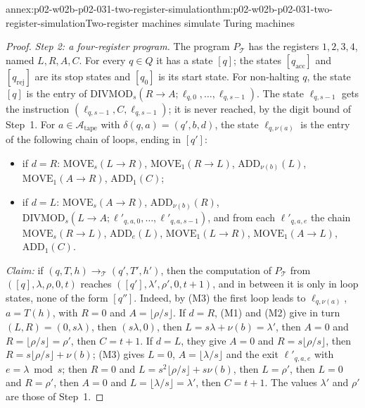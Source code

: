 \begin{annexitem}{annex:p02-w02b-p02-031-two-register-simulation}{thm:p02-w02b-p02-031-two-register-simulation}{Two-register machines simulate Turing machines}
\begin{proof}
\emph{Step 2: a four-register program.}  The program \(P_{\mathcal T}\) has the
registers \(1,2,3,4\), named \(L,R,A,C\).  For every \(q\in Q\) it has a state
\([q]\); the states \([q_{\mathrm{acc}}]\) and \([q_{\mathrm{rej}}]\) are its stop
states and \([q_0]\) is its start state.  For non-halting \(q\), the state
\([q]\) is the entry of \(\mathrm{DIVMOD}_s(R\to A;\allowbreak\ell_{q,0},\ldots,
\ell_{q,s-1})\).  The state \(\ell_{q,s-1}\) gets the instruction
\((\ell_{q,s-1},C,\ell_{q,s-1})\); it is never reached, by the digit bound of
Step~1.  For \(a\in\mathcal A_{\mathrm{tape}}\) with
\(\delta(q,a)=(q',b,d)\), the state \(\ell_{q,\nu(a)}\) is the entry of the
following chain of loops, ending in \([q']\):
\begin{itemize}
\item if \(d=R\): \(\mathrm{MOVE}_s(L\to R)\), \(\mathrm{MOVE}_1(R\to L)\),
      \(\mathrm{ADD}_{\nu(b)}(L)\), \(\mathrm{MOVE}_1(A\to R)\),
      \(\mathrm{ADD}_1(C)\);
\item if \(d=L\): \(\mathrm{MOVE}_s(A\to R)\), \(\mathrm{ADD}_{\nu(b)}(R)\),
      \(\mathrm{DIVMOD}_s(L\to A;\allowbreak\ell'_{q,a,0},\ldots,\allowbreak\ell'_{q,a,s-1})\), and
      from each \(\ell'_{q,a,e}\) the chain \(\mathrm{MOVE}_s(R\to L)\),
      \(\mathrm{ADD}_{e}(L)\), \(\mathrm{MOVE}_1(L\to R)\),
      \(\mathrm{MOVE}_1(A\to L)\), \(\mathrm{ADD}_1(C)\).
\end{itemize}
\emph{Claim:} if \((q,T,h)\to_{\mathcal T}(q',T',h')\), then the
computation of \(P_{\mathcal T}\) from \(([q],\lambda,\rho,0,t)\) reaches
\(([q'],\lambda',\rho',0,t+1)\), and in between it is only in loop states, none
of the form \([q'']\).  Indeed, by (M3) the first loop leads to
\(\ell_{q,\nu(a)}\), \(a=T(h)\), with \(R=0\) and \(A=\lfloor\rho/s\rfloor\).
If \(d=R\), (M1) and (M2) give in turn \((L,R)=(0,s\lambda)\), then
\((s\lambda,0)\), then \(L=s\lambda+\nu(b)=\lambda'\), then \(A=0\) and
\(R=\lfloor\rho/s\rfloor=\rho'\), then \(C=t+1\).  If \(d=L\), they give
\(A=0\) and \(R=s\lfloor\rho/s\rfloor\), then \(R=s\lfloor\rho/s\rfloor+
\nu(b)\); (M3) gives \(L=0\), \(A=\lfloor\lambda/s\rfloor\) and the exit
\(\ell'_{q,a,e}\) with \(e=\lambda\bmod s\); then \(R=0\) and
\(L=s^{2}\lfloor\rho/s\rfloor+s\nu(b)\), then \(L=\rho'\), then \(L=0\) and
\(R=\rho'\), then \(A=0\) and \(L=\lfloor\lambda/s\rfloor=\lambda'\), then
\(C=t+1\).  The values \(\lambda'\) and \(\rho'\) are those of Step~1.


\end{proof}
\end{annexitem}
